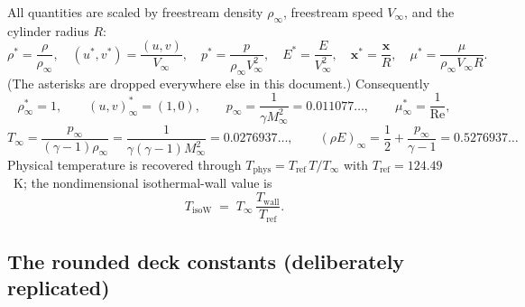 \documentclass[11pt]{article}
\newcommand{\bx}{\mathbf{x}}
\newcommand{\Minf}{M_\infty}
\newcommand{\Rey}{\mathrm{Re}}
\begin{document}
All quantities are scaled by freestream density $\rho_\infty$, freestream
speed $V_\infty$, and the cylinder radius $R$:
\begin{equation}
\rho^* = \frac{\rho}{\rho_\infty},\quad
(u^*,v^*) = \frac{(u,v)}{V_\infty},\quad
p^* = \frac{p}{\rho_\infty V_\infty^2},\quad
E^* = \frac{E}{V_\infty^2},\quad
\bx^* = \frac{\bx}{R},\quad
\mu^* = \frac{\mu}{\rho_\infty V_\infty R}.
\end{equation}
(The asterisks are dropped everywhere else in this document.) Consequently
\begin{equation}
\rho_\infty^* = 1,\qquad
(u,v)_\infty^* = (1, 0),\qquad
p_\infty = \frac{1}{\gamma \Minf^2} = 0.011077\ldots,\qquad
\mu_\infty^* = \frac{1}{\Rey},
\end{equation}
\begin{equation}
T_\infty = \frac{p_\infty}{(\gamma-1)\rho_\infty}
= \frac{1}{\gamma(\gamma-1)\Minf^2} = 0.0276937\ldots,
\qquad
(\rho E)_\infty = \frac12 + \frac{p_\infty}{\gamma-1} = 0.5276937\ldots
\end{equation}
Physical temperature is recovered through
$T_{\mathrm{phys}} = T_{\mathrm{ref}}\, T/T_\infty$ with
$T_{\mathrm{ref}} = 124.49$~K; the nondimensional isothermal-wall value is
\begin{equation}
T_{\mathrm{isoW}} \;=\; T_\infty\,
\frac{T_{\mathrm{wall}}}{T_{\mathrm{ref}}} .
\end{equation}

\subsection{The rounded deck constants (deliberately replicated)}
\label{sec:rounded}
\end{document}
